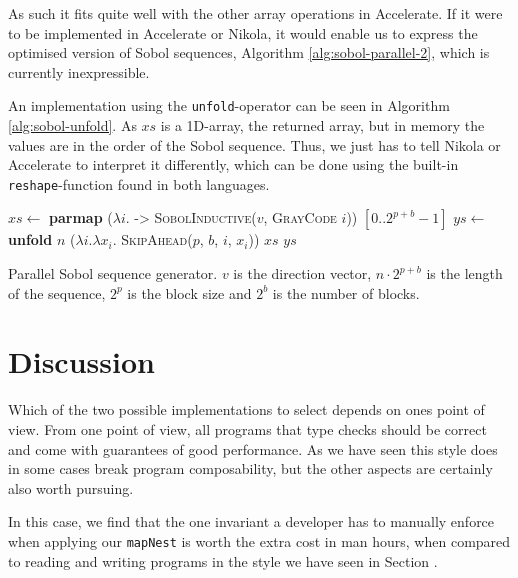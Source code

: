 As such it fits quite well with the other array operations in
Accelerate. If it were to be implemented in Accelerate or Nikola, it
would enable us to express the optimised version of Sobol sequences,
Algorithm \ref{alg:sobol-parallel-2}, which is currently
inexpressible. 

An implementation using the \lstinline{unfold}-operator can be seen in
Algorithm \ref{alg:sobol-unfold}. As $xs$ is a 1D-array, the returned
array, but in memory the values are in the order of the Sobol
sequence. Thus, we just has to tell Nikola or Accelerate to interpret
it differently, which can be done using the built-in
\lstinline{reshape}-function found in both languages.

\begin{algorithm}
  \begin{algorithmic}
    \State $xs \gets$ \textbf{parmap} ($\lambda i$. -> \textsc{SobolInductive}($v$, \textsc{GrayCode} $i$)) $[0..2^{p+b}-1]$
    \State $ys \gets$ \textbf{unfold} $n$ ($\lambda i. \lambda x_i$. \textsc{SkipAhead}($p$, $b$, $i$, $x_i$)) $xs$
    \State \Return $ys$
    \EndFunction
  \end{algorithmic}
  \caption{Parallel Sobol sequence generator. $v$ is the direction
    vector, $n \cdot 2^{p+b}$ is the length of the sequence, $2^p$ is the block size
    and $2^b$ is the number of blocks.}
  \label{alg:sobol-unfold}
\end{algorithm}


\section{Discussion}
Which of the two possible implementations to select depends on ones
point of view. From one point of view, all programs that type checks
should be correct and come with guarantees of good performance. As we
have seen this style does in some cases break program composability,
but the other aspects are certainly also worth pursuing.

In this case, we find that the one invariant a developer has to
manually enforce when applying our \lstinline{mapNest} is worth the
extra cost in man hours, when compared to reading and writing programs
in the style we have seen in Section .

